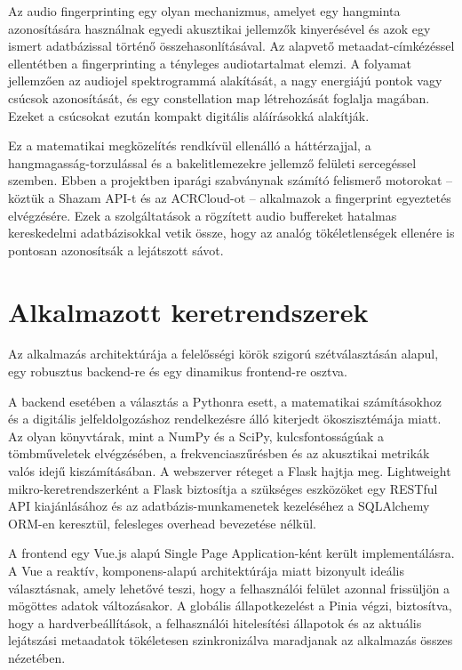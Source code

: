 \documentclass[12pt,a4paper,hungarian]{report}
\begin{document}
Az audio fingerprinting egy olyan mechanizmus, amelyet egy hangminta azonosítására használnak egyedi akusztikai jellemzők kinyerésével és azok egy ismert adatbázissal történő összehasonlításával. Az alapvető metaadat-címkézéssel ellentétben a fingerprinting a tényleges audiotartalmat elemzi. A folyamat jellemzően az audiojel spektrogrammá alakítását, a nagy energiájú pontok vagy csúcsok azonosítását, és egy constellation map létrehozását foglalja magában. Ezeket a csúcsokat ezután kompakt digitális aláírásokká alakítják.

Ez a matematikai megközelítés rendkívül ellenálló a háttérzajjal, a hangmagasság-torzulással és a bakelitlemezekre jellemző felületi sercegéssel szemben. Ebben a projektben iparági szabványnak számító felismerő motorokat – köztük a Shazam API-t és az ACRCloud-ot – alkalmazok a fingerprint egyeztetés elvégzésére. Ezek a szolgáltatások a rögzített audio buffereket hatalmas kereskedelmi adatbázisokkal vetik össze, hogy az analóg tökéletlenségek ellenére is pontosan azonosítsák a lejátszott sávot.

\section{Alkalmazott keretrendszerek}

Az alkalmazás architektúrája a felelősségi körök szigorú szétválasztásán alapul, egy robusztus backend-re és egy dinamikus frontend-re osztva.

A backend esetében a választás a Pythonra esett, a matematikai számításokhoz és a digitális jelfeldolgozáshoz rendelkezésre álló kiterjedt ökoszisztémája miatt. Az olyan könyvtárak, mint a NumPy és a SciPy, kulcsfontosságúak a tömbműveletek elvégzésében, a frekvenciaszűrésben és az akusztikai metrikák valós idejű kiszámításában. A webszerver réteget a Flask hajtja meg. Lightweight mikro-keretrendszerként a Flask biztosítja a szükséges eszközöket egy RESTful API kiajánlásához és az adatbázis-munkamenetek kezeléséhez a SQLAlchemy ORM-en keresztül, felesleges overhead bevezetése nélkül.

A frontend egy Vue.js alapú Single Page Application-ként került implementálásra. A Vue a reaktív, komponens-alapú architektúrája miatt bizonyult ideális választásnak, amely lehetővé teszi, hogy a felhasználói felület azonnal frissüljön a mögöttes adatok változásakor. A globális állapotkezelést a Pinia végzi, biztosítva, hogy a hardverbeállítások, a felhasználói hitelesítési állapotok és az aktuális lejátszási metaadatok tökéletesen szinkronizálva maradjanak az alkalmazás összes nézetében.
\end{document}
